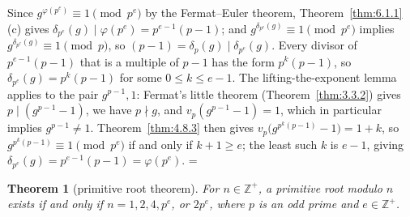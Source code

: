 \documentclass[11pt]{article}
\makeatletter
\theoremstyle{ntstyle}
\newtheorem{theorem}{Theorem}[subsection]
\let\nt@closedisplay\]
\def\nt@guardedclose{\@ifnextchar\par{\nt@closeafterpar}{\@ifnextchar\end{\postdisplaypenalty\@M\nt@closedisplay}{\nt@closedisplay}}}
\def\nt@closeafterpar\par{\@ifnextchar\par{\nt@closeafterpar}{\@ifnextchar\end{\postdisplaypenalty\@M\nt@closedisplay\par}{\nt@closedisplay\par}}}
\renewenvironment{proof}[1][\proofname]{\par
  \pushQED{\qed}\normalfont\topsep\medskipamount\edef\nt@afterproof{\@endparpenalty=\the\@endparpenalty\relax}\@beginparpenalty\@M\@endparpenalty\@M\let\]\nt@guardedclose\trivlist\item[]\textit{#1\@addpunct{.}} \ignorespaces}{\ifvmode\addpenalty\@M\fi\popQED\nt@afterproof\endtrivlist\@endpefalse}
\makeatother
\begin{document}
\begin{proof} Since $g^{\varphi(p^e)}\equiv1\pmod{p^e}$ by the
	Fermat--Euler theorem, Theorem~\ref{thm:6.1.1}(c) gives
	$\delta_{p^e}(g)\mid\varphi(p^e)=p^{e-1}(p-1)$; and
	$g^{\delta_{p^e}(g)}\equiv1\pmod{p^e}$ implies
	$g^{\delta_{p^e}(g)}\equiv1\pmod{p}$, so
	$(p-1)=\delta_p(g)\mid\delta_{p^e}(g)$. Every divisor of $p^{e-1}(p-1)$ that
	is a multiple of $p-1$ has the form $p^{k}(p-1)$, so
	$\delta_{p^e}(g)=p^{k}(p-1)$ for some $0\le k\le e-1$. The lifting-the-exponent lemma applies to
	the pair $g^{p-1},1$: Fermat's little
	theorem (Theorem~\ref{thm:3.3.2}) gives $p\mid(g^{p-1}-1)$, we have
	$p\nmid g$, and
	$v_p(g^{p-1}-1)=1$, which in particular implies $g^{p-1}\neq1$. Theorem~\ref{thm:4.8.3} then gives
	$v_p\big(g^{p^{k}(p-1)}-1\big)=1+k$, so
	$g^{p^{k}(p-1)}\equiv1\pmod{p^e}$ if and only if $k+1\ge e$; the least such
	$k$ is $e-1$, giving $\delta_{p^e}(g)=p^{e-1}(p-1)=\varphi(p^e)$.
\end{proof}
\begin{theorem}[primitive root theorem]\label{thm:6.2.6}
	For $n \in \mathbb{Z}^+$, a primitive root modulo $n$ exists if and
	only if $n = 1, 2, 4,
		p^{e}$, or $2 p^{e}$, where $p$ is an odd prime and $e \in \mathbb{Z}^+$.
\end{theorem}
\end{document}
